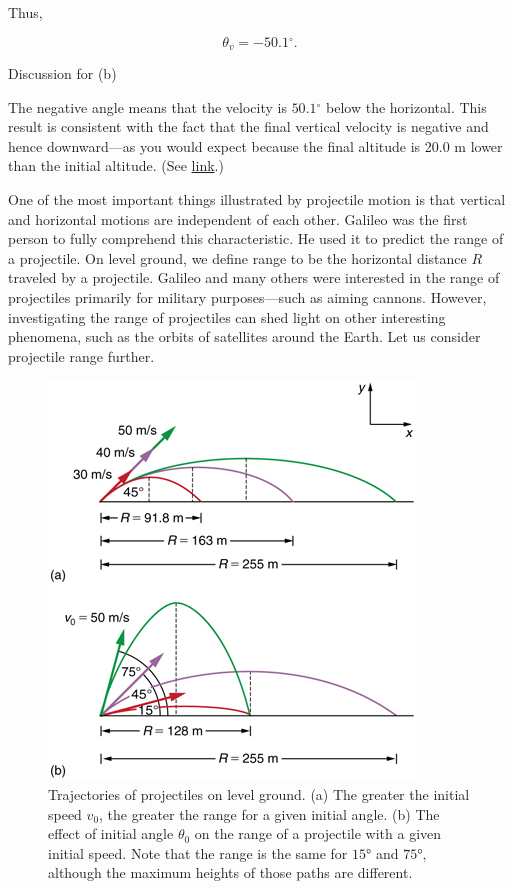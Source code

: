 \documentclass[
]{book}
\newenvironment{tinysection}{}{}
\begin{document}
Thus,

\leavevmode\hypertarget{eip-379}{}%
\[{{\theta_{v} = {- \text{50}}}\text{.}1{{^\circ}\text{.}}}{}\]

\begin{tinysection}

{Discussion for (b)}

\end{tinysection}

The negative angle means that the velocity is
\({\text{50}\text{.}1{^\circ}}{}\) below the horizontal. This result is
consistent with the fact that the final vertical velocity is negative
and hence downward---as you would expect because the final altitude is
20.0 m lower than the initial altitude. (See
\protect\hyperlink{import-auto-id1817519}{link}.)

One of the most important things illustrated by projectile motion is
that vertical and horizontal motions are independent of each other.
Galileo was the first person to fully comprehend this characteristic. He
used it to predict the range of a projectile. On level ground, we define
\protect\hypertarget{import-auto-id1751163}{}{range} to be the horizontal
distance \(R{}\) traveled by a projectile. Galileo and many others were
interested in the range of projectiles primarily for military
purposes---such as aiming cannons. However, investigating the range of
projectiles can shed light on other interesting phenomena, such as the
orbits of satellites around the Earth. Let us consider projectile range
further.

\begin{figure}
\hypertarget{import-auto-id1904800}{%
\centering
\includegraphics{images/Figure_03_04_05a.jpg}
\caption{Trajectories of projectiles on level ground. (a) The greater the
initial speed \(v_{0}{}\), the greater the range for a given initial
angle. (b) The effect of initial angle \(\theta_{0}{}\) on the range of a
projectile with a given initial speed. Note that the range is the same
for \(\text{15°}{}\) and \(\text{75°}{}\), although the maximum heights of
those paths are
different.}\label{import-auto-id1904800}
}
\end{figure}
\end{document}
